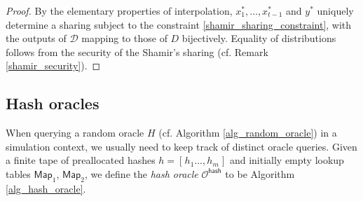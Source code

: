 \documentclass[10pt, psamsfonts, reqno]{amsart}
\theoremstyle{definition}
\theoremstyle{remark}
\numberwithin{equation}{section}
\begin{document}
\begin{proof}
By the elementary properties of interpolation,
$x_1^*, \dots, x_{t-1}^*$ and $y^*$
uniquely determine a sharing
subject to the constraint \eqref{shamir_sharing_constraint},
with the outputs of $\mathcal{D}$
mapping to those of $D$ bijectively.
Equality of distributions follows
from the security of the Shamir's sharing
(cf. Remark \ref{shamir_security}).
\end{proof}

\subsection{Hash oracles}\label{section_hash_oracles}

When querying a random oracle $H$
(cf. Algorithm \ref{alg_random_oracle})
in a simulation context,
we usually need to keep track of distinct oracle queries.
Given a finite tape of preallocated hashes
$h = [\hspace{1pt}h_1 \dots, h_m \hspace{1pt}]$
and initially empty lookup tables
$\mathsf{Map}_1$, $\mathsf{Map}_2$,
we define the \textit{hash oracle} $\mathcal{O}^{\mathsf{hash}}$
to be Algorithm \ref{alg_hash_oracle}.
\end{document}
